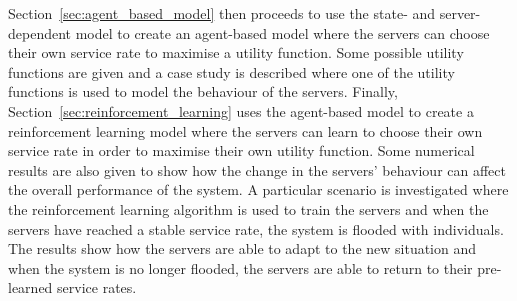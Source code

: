 Section~\ref{sec:agent_based_model} then proceeds to use the state- and
server-dependent model to create an agent-based model where the servers can
choose their own service rate to maximise a utility function.
Some possible utility functions are given and a case study is described where
one of the utility functions is used to model the behaviour of the servers.
Finally, Section~\ref{sec:reinforcement_learning} uses the agent-based model
to create a reinforcement learning model where the servers can learn to choose
their own service rate in order to maximise their own utility function.
Some numerical results are also given to show how the change in the servers'
behaviour can affect the overall performance of the system.
A particular scenario is investigated where the reinforcement learning
algorithm is used to train the servers and when the servers have reached a
stable service rate, the system is flooded with individuals.
The results show how the servers are able to adapt to the new situation and
when the system is no longer flooded, the servers are able to return to their
pre-learned service rates.
